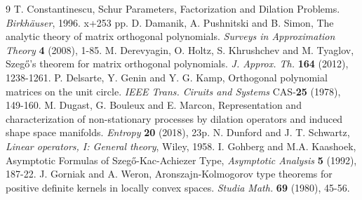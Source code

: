 \documentclass[11pt]{article}
\begin{document}
\begin{thebibliography}{9}
 T. Constantinescu, Schur Parameters, Factorization and Dilation Problems. {\sl Birkh\"auser}, 1996. x+253 pp. 
 D. Damanik, A. Pushnitski and B. Simon, The analytic theory of matrix orthogonal polynomials. {\sl Surveys in Approximation Theory} {\bf 4} (2008), 1-85.
 M. Derevyagin, O. Holtz, S. Khrushchev and M. Tyaglov, Szeg\H{o}'s theorem for matrix orthogonal polynomials. {\sl J. Approx. Th.} {\bf 164} (2012), 1238-1261.
 P. Delsarte, Y. Genin and Y. G. Kamp, Orthogonal polynomial matrices on the unit circle.  {\sl IEEE Trans. Ciruits and Systems} CAS-{\bf 25} (1978), 149-160. 
 M. Dugast, G. Bouleux and E. Marcon, Representation and characterization of non-stationary processes by dilation operators and induced shape space manifolds.  {\sl Entropy} {\bf 20} (2018), 23p. 
 N. Dunford and J. T. Schwartz, {\sl Linear operators, I: General theory}, Wiley, 1958. 
 I. Gohberg and M.A. Kaashoek, Asymptotic Formulas of Szeg\H{o}-Kac-Achiezer Type, {\sl Asymptotic Analysis} {\bf 5} (1992), 187-22.
 J. Gorniak and A. Weron, Aronszajn-Kolmogorov type theorems for positive definite kernels in locally convex spaces.  {\sl Studia Math.} {\bf 69} (1980), 45-56.

\end{thebibliography}
\end{document}
